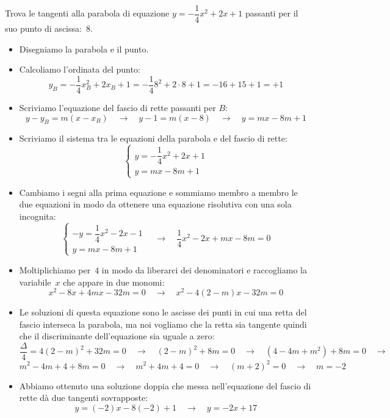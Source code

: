 \begin{esempio}
 Trova le tangenti alla parabola di equazione \(y=-\dfrac{1}{4}x^2+2x +1\)
 passanti per il suo punto di ascissa:~\(8\).

 \begin{itemize}
  \item Disegniamo la parabola e il punto.
  \item Calcoliamo l'ordinata del punto:
\[y_B=-\dfrac{1}{4}x_B^2+2x_B+1=-\dfrac{1}{4}8^2+2 \cdot 8+1= -16+15+1=+1\]
  \item Scriviamo l'equazione del fascio di rette passanti per \(B\):
\[y-y_B = m(x-x_B) \quad \rightarrow \quad
y-1 = m\left(x-8\right)
\quad \rightarrow \quad y=mx-8m+1\]
  \item Scriviamo il sistema tra le equazioni della parabola e del fascio di
   rette:
\[\left\{\begin{array}{l}
  y=-\dfrac{1}{4}x^2+2x +1\\
  y=mx-8m+1
\end{array}\right. \]
  \item Cambiamo i segni alla prima equazione e sommiamo membro a membro le
   due equazioni in modo da ottenere una equazione risolutiva con una sola
   incognita:
\[\left\{\begin{array}{l}
  -y=\dfrac{1}{4}x^2-2x-1\\
  y=mx-8m+1
\end{array}\right. \quad \rightarrow \quad
\dfrac{1}{4}x^2-2x+mx-8m=0\]
  \item Moltiplichiamo per~\(4\) in modo da liberarci dei denominatori e
   raccogliamo la variabile~\(x\) che appare in due monomi:
\[x^2-8x+4mx-32m=0 \quad \rightarrow \quad x^2-4(2-m)x-32m=0\]
  \item Le soluzioni di questa equazione sono le ascisse dei punti in cui una
   retta del fascio interseca la parabola, ma noi vogliamo che la retta sia
   tangente quindi che il discriminante dell'equazione sia uguale a zero:
\[\dfrac{\Delta}{4}=4(2-m)^2+32m=0 \quad \rightarrow \quad
(2-m)^2+8m=0 \quad \rightarrow \quad
(4-4m+m^2)+8m=0 \quad \rightarrow \quad\]
\[m^2-4m+4+8m=0 \quad \rightarrow \quad
m^2+4m+4=0 \quad \rightarrow \quad
(m+2)^2=0  \quad \rightarrow \quad m=-2\]
  \item Abbiamo ottenuto una soluzione doppia che messa nell'equazione del
   fascio di rette dà due tangenti sovrapposte:
\[y=(-2)x-8(-2)+1 \quad \rightarrow \quad y=-2x+17\]
 \end{itemize}
\end{esempio}

